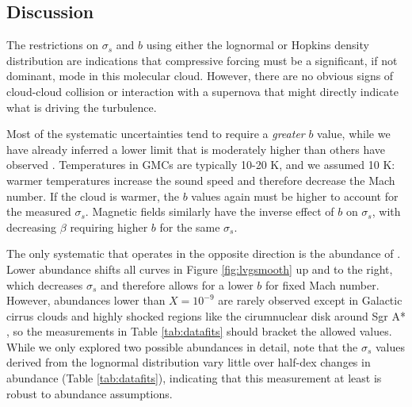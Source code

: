 % 
% 
% 

\subsection{Discussion}
The restrictions on $\sigma_s$ and $b$ using either the lognormal or Hopkins density
distribution are indications that compressive forcing must be a significant, if
not dominant, mode in this molecular cloud.  However, there are no obvious
signs of cloud-cloud collision or interaction with a supernova that might
directly indicate what is driving the turbulence.

Most of the systematic uncertainties tend to require a \emph{greater} $b$
value, while we have already inferred a lower limit
that is moderately higher than others have observed \citep{Brunt2010c,Kainulainen2013a}.
Temperatures in GMCs are typically 10-20 K, and we assumed 10 K: warmer
temperatures increase the sound speed and therefore decrease the Mach number. If
the cloud is warmer, the $b$ values again must be higher to account for the measured
$\sigma_s$.  Magnetic fields similarly have the inverse effect of $b$ on
$\sigma_s$, with decreasing $\beta$ requiring higher $b$ for the same
$\sigma_s$.

The only systematic that operates in the opposite direction is the abundance of
\ortho.  Lower abundance shifts all curves in Figure \ref{fig:lvgsmooth} up and
to the right, which decreases $\sigma_s$ and therefore allows for a lower $b$
for fixed Mach number.  However, abundances lower  than $X=10^{-9}$ are rarely
observed except in Galactic cirrus clouds \citep{Turner1989a} and highly
shocked regions like the cirumnuclear disk around Sgr A* \citep{Pauls1996a}, so
the measurements in Table \ref{tab:datafits} should bracket the allowed values.
While we only explored two possible abundances in detail, note that the
$\sigma_s$ values derived from the lognormal distribution vary little over
half-dex changes in abundance (Table \ref{tab:datafits}), indicating that this
measurement at least is robust to abundance assumptions.

